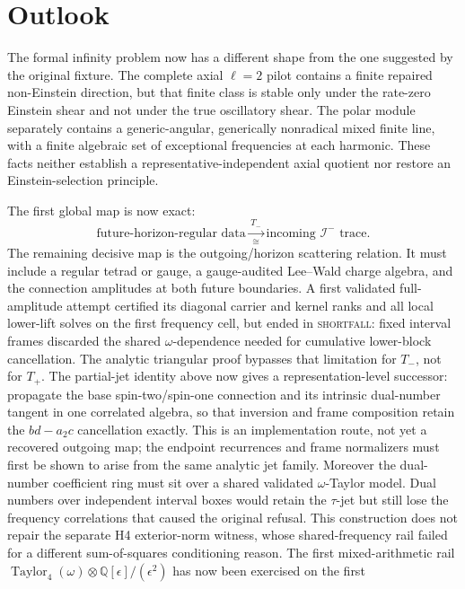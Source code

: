 \documentclass[11pt]{article}
\theoremstyle{definition}
\theoremstyle{remark}
\begin{document}
\section{Outlook}

The formal infinity problem now has a different shape from the one suggested
by the original fixture.  The complete axial \(\ell=2\) pilot contains a
finite repaired non-Einstein direction, but that finite class is stable only
under the rate-zero Einstein shear and not under the true oscillatory shear.
The polar module separately contains a generic-angular, generically
nonradical mixed finite line, with a finite algebraic set of exceptional
frequencies at each harmonic.  These facts neither establish a
representative-independent axial quotient nor restore an Einstein-selection
principle.

The first global map is now exact:
\[
 \text{future-horizon-regular data}
 \xrightarrow[\cong]{\,T_-\,}
 \text{incoming }\mathscr I^- \text{ trace}.
\]
The remaining decisive map is the outgoing/horizon scattering relation.  It
must include a regular tetrad or gauge, a gauge-audited Lee--Wald charge
algebra, and the connection amplitudes at both future boundaries.  A first
validated full-amplitude attempt certified its diagonal carrier and kernel
ranks and all local lower-lift solves on the first frequency cell, but ended
in \textsc{shortfall}: fixed interval frames discarded the shared
\(\omega\)-dependence needed for cumulative lower-block cancellation.  The
analytic triangular proof bypasses that limitation for \(T_-\), not for
\(T_+\).  The partial-jet identity above now gives a representation-level
successor: propagate the base spin-two/spin-one connection and its intrinsic
dual-number tangent in one correlated algebra, so that inversion and frame
composition retain the \(bd-a_2c\) cancellation exactly.  This is an
implementation route, not yet a recovered outgoing map; the endpoint
recurrences and frame normalizers must first be shown to arise from the same
analytic jet family.  Moreover the dual-number coefficient ring must sit
over a shared validated \(\omega\)-Taylor model.  Dual numbers over
independent interval boxes would retain the \(\tau\)-jet but still lose the
frequency correlations that caused the original refusal.  This construction
does not repair the separate H4 exterior-norm witness, whose shared-frequency
rail failed for a different sum-of-squares conditioning reason.
The first mixed-arithmetic rail
\(\operatorname{Taylor}_4(\omega)\otimes
\mathbb Q[\epsilon]/(\epsilon^2)\) has now been exercised on the first
\end{document}
